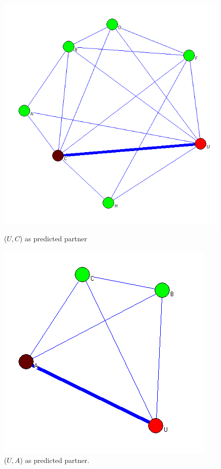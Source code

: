 \documentclass[]{article}
\begin{document}
\begin{figure}[!htbp]
\begin{minipage}[b]{0.5\linewidth}
\centering
\includegraphics[width=\textwidth]{exp_dispersion.png}
\caption{($U,C$) as predicted partner}
\label{fig:figure1}
\end{minipage}
\hspace{0.5cm}
\begin{minipage}[b]{0.5\linewidth}
\centering
\includegraphics[width=\textwidth]{p6disper.png}
\caption{($U,A$) as predicted partner. }
\label{fig:figure2}
\end{minipage}
\end{figure}
\end{document}
